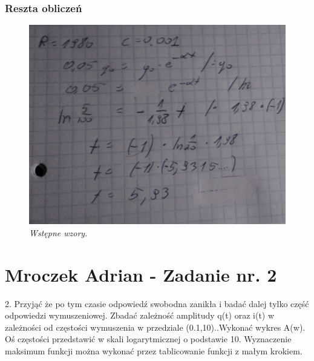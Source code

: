 \documentclass[12pt,oneside,a4paper]{book} %
\begin{document}
\subsection{Reszta obliczeń}
\begin{figure}[h]
\begin{center} 

\includegraphics[scale=0.5]{./images/01.PNG} 

\caption{\textit{Wstępne wzory}.\newline }
\label{rys:logoup}
\end{center}
\end{figure}



\chapter{Mroczek Adrian - Zadanie nr. 2 }

2. Przyjąć że po tym czasie odpowiedź swobodna zanikła i badać dalej tylko część
odpowiedzi wymuszeniowej. Zbadać zależność amplitudy q(t) oraz i(t) w zależności
od częstości wymuszenia w przedziale (0.1,10)..Wykonać wykres A(w). Oś częstości przedstawić w skali logarytmicznej
o podstawie 10. Wyznaczenie maksimum funkcji można wykonać przez tablicowanie funkcji z małym krokiem.
\end{document}
